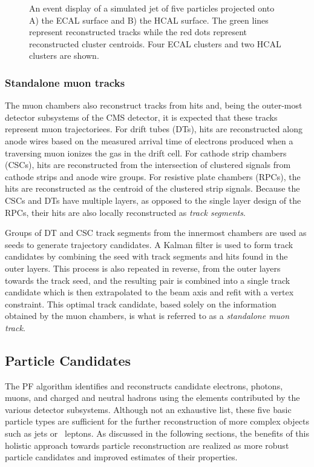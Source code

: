 \begin{figure}[htbp]
{  }
  \caption[Event Display of Calorimeter Clusters]{An event display of a simulated jet of five particles projected onto A) the ECAL surface and B) the HCAL surface. The green lines represent reconstructed tracks while the red dots represent reconstructed cluster centroids. Four ECAL clusters and two HCAL clusters are shown.\cite{PARTICLEFLOW}}
    \label{fig:caloclusters}
\end{figure}

\subsubsection{Standalone muon tracks}\label{standalonemuontrack}

The muon chambers also reconstruct tracks from hits and, being the outer-most detector subsystems of the CMS detector, it is expected that these tracks represent muon trajectoriees. For drift tubes (DTs), hits are reconstructed along anode wires based on the measured arrival time of electrons produced when a traversing muon ionizes the gas in the drift cell. For cathode strip chambers (CSCs), hits are reconstructed from the intersection of clustered signals from cathode strips and anode wire groups. For resistive plate chambers (RPCs), the hits are reconstructed as the centroid of the clustered strip signals. Because the CSCs and DTs have multiple layers, as opposed to the single layer design of the RPCs, their hits are also locally reconstructed as \textit{track segments}.

Groups of DT and CSC track segments from the innermost chambers are used as seeds to generate trajectory candidates. A Kalman filter\cite{MUONKF} is used to form track candidates by combining the seed with track segments and hits found in the outer layers. This process is also repeated in reverse, from the outer layers towards the track seed, and the resulting pair is combined into a single track candidate which is then extrapolated to the beam axis and refit with a vertex constraint. This optimal track candidate, based solely on the information obtained by the muon chambers, is what is referred to as a \textit{standalone muon track}.

\subsection{Particle Candidates}

The PF algorithm identifies and reconstructs candidate electrons, photons, muons, and charged and neutral hadrons using the elements contributed by the various detector subsystems. Although not an exhaustive list, these five basic particle types are sufficient for the further reconstruction of more complex objects such as jets or \lept\ leptons. As discussed in the following sections, the benefits of this holistic approach towards particle reconstruction are realized as more robust particle candidates and improved estimates of their properties.

